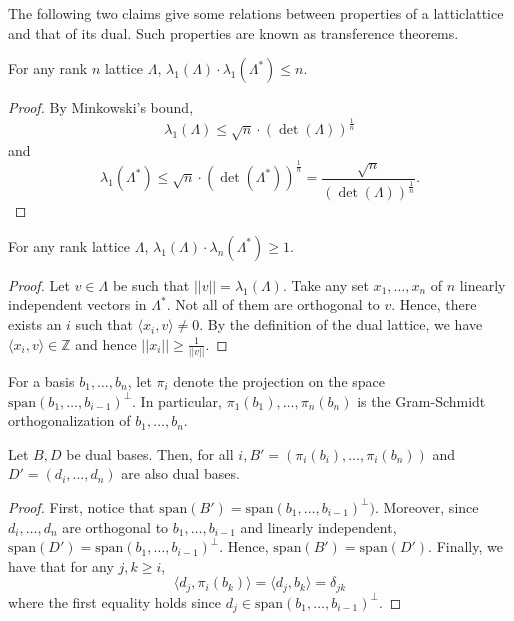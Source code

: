 \par The following two claims give some relations between properties of
a latticlattice and that of its dual. Such properties are known as transference
theorems.
\begin{proposition}
  For any rank $n$ lattice $\Lambda$,
  $\lambda_1(\Lambda)\cdot\lambda_1(\Lambda^*)\leq n$.
  \label{prop:transference}
\end{proposition}
\begin{proof}
  By Minkowski's bound,
  \begin{equation}
    \lambda_1(\Lambda) \leq \sqrt{n}\cdot(\det(\Lambda))^{\frac{1}{n}}
  \end{equation}
  and
  \begin{equation}
    \lambda_1(\Lambda^*)\leq \sqrt{n}\cdot(\det(\Lambda^*))^{\frac{1}{n}}
  = \frac{\sqrt{n}}{(\det(\Lambda))^{\frac{1}{n}}}.
\end{equation}
\end{proof}
\begin{proposition}
  For any rank lattice $\Lambda$,
  $\lambda_1(\Lambda)\cdot\lambda_n(\Lambda^*)\geq 1.$
\end{proposition}
\begin{proof}
  Let $v\in\Lambda$ be  such that $||v||=\lambda_1(\Lambda)$. Take any set
  $x_1,\dots,x_n$ of $n$ linearly independent vectors in $\Lambda^*$. Not all
  of them are orthogonal to $v$. Hence, there exists an $i$ such that $\langle
  x_i,v\rangle\neq 0$. By the definition of the dual lattice, we have $\langle
  x_i,v\rangle\in\mathbb{Z}$ and hence $||x_i||\geq\frac{1}{||v||}$.
\end{proof}
For a basis $b_1,\dots,b_n$, let $\pi_i$ denote the projection on the space
$\mathrm{span}(b_1,\dots,b_{i-1})^{\perp}$. In particular,
$\pi_1(b_1),\dots,\pi_n(b_n)$ is the Gram-Schmidt orthogonalization of
$b_1,\dots, b_n$.
\begin{proposition}
  Let $B,D$ be dual bases. Then, for all $i, B'=(\pi_i(b_i),\dots,\pi_i(b_n))$
  and $D' = (d_i,\dots,d_n)$ are also dual bases.
  \label{prop:dualbases}
\end{proposition}
\begin{proof}
  First, notice that $\mathrm{span}(B')
  = \mathrm{span}(b_1,\dots,b_{i-1})^{\perp})$. Moreover, since
  $d_i,\dots,d_n$ are orthogonal to $b_1,\dots,b_{i-1}$ and linearly
  independent, $\mathrm{span}(D') = \mathrm{span}(b_1,\dots,b_{i-1})^\perp$.
Hence, $\mathrm{span}(B') = \mathrm{span}(D')$. Finally, we have that for any
$j,k\geq i$,
\begin{equation}
  \langle d_j,\pi_i(b_k)\rangle = \langle d_j, b_k\rangle = \delta_{jk}
\end{equation}
where the first equality holds since
$d_j\in\mathrm{span}(b_1,\dots,b_{i-1})^\perp$.
\end{proof}

